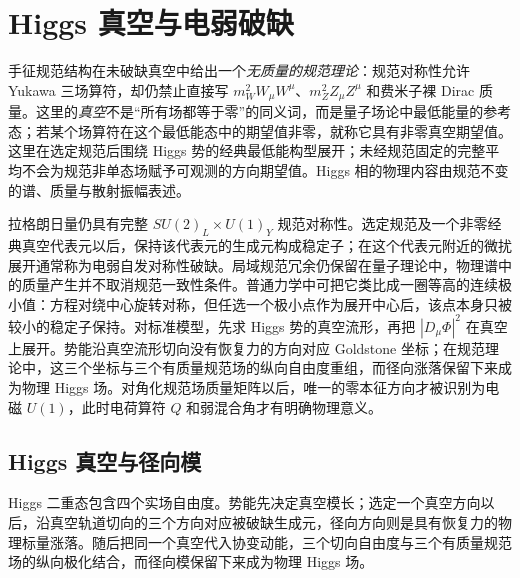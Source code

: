 \section{Higgs 真空与电弱破缺}\label{sec:sm-higgs-ewsb-dp11}

手征规范结构在未破缺真空中给出一个\emph{无质量的规范理论}：规范对称性允许 Yukawa 三场算符，却仍禁止直接写 $m_W^2W_\mu W^\mu$、$m_Z^2Z_\mu Z^\mu$ 和费米子裸 Dirac 质量。这里的\emph{真空}不是“所有场都等于零”的同义词，而是量子场论中最低能量的参考态；若某个场算符在这个最低能态中的期望值非零，就称它具有非零真空期望值。这里在选定规范后围绕 Higgs 势的经典最低能构型展开；未经规范固定的完整平均不会为规范非单态场赋予可观测的方向期望值。Higgs 相的物理内容由规范不变的谱、质量与散射振幅表述。

拉格朗日量仍具有完整 $SU(2)_L\times U(1)_Y$ 规范对称性。选定规范及一个非零经典真空代表元以后，保持该代表元的生成元构成稳定子；在这个代表元附近的微扰展开通常称为电弱自发对称性破缺。局域规范冗余仍保留在量子理论中，物理谱中的质量产生并不取消规范一致性条件。普通力学中可把它类比成一圈等高的连续极小值：方程对绕中心旋转对称，但任选一个极小点作为展开中心后，该点本身只被较小的稳定子保持。对标准模型，先求 Higgs 势的真空流形，再把 $|D_\mu\Phi|^2$ 在真空上展开。势能沿真空流形切向没有恢复力的方向对应 Goldstone 坐标；在规范理论中，这三个坐标与三个有质量规范场的纵向自由度重组，而径向涨落保留下来成为物理 Higgs 场。对角化规范场质量矩阵以后，唯一的零本征方向才被识别为电磁 $U(1)$，此时电荷算符 $Q$ 和弱混合角才有明确物理意义。

\subsection{Higgs 真空与径向模}

Higgs 二重态包含四个实场自由度。势能先决定真空模长；选定一个真空方向以后，沿真空轨道切向的三个方向对应被破缺生成元，径向方向则是具有恢复力的物理标量涨落。随后把同一个真空代入协变动能，三个切向自由度与三个有质量规范场的纵向极化结合，而径向模保留下来成为物理 Higgs 场。

